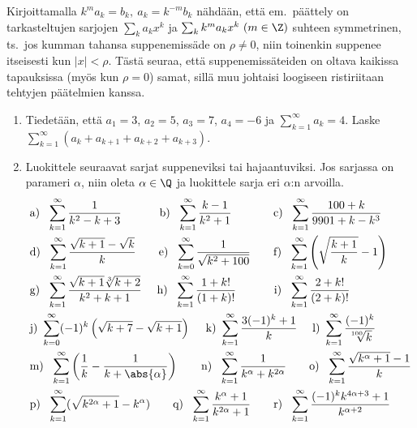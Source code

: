 Kirjoittamalla $k^ma_k=b_k,\ a_k=k^{-m}b_k$ nähdään, että em.\ päättely on tarkasteltujen
sarjojen $\sum_ka_kx^k$ ja $\sum_kk^ma_kx^k\ (m\in\Z)$ suhteen symmetrinen, ts.\ jos kumman
tahansa suppenemissäde on $\rho \neq 0$, niin toinenkin suppenee itseisesti kun $|x|<\rho$.
Tästä seuraa, että suppenemissäteiden on oltava kaikissa tapauksissa (myös kun $\rho=0$)
samat, sillä muu johtaisi loogiseen ristiriitaan tehtyjen päätelmien kanssa. \loppu  

\Harj
\begin{enumerate}

\item
Tiedetään, että $a_1=3$, $a_2=5$, $a_3=7$, $a_4=-6$ ja $\sum_{k=1}^\infty a_k=4$. Laske \newline
$\sum_{k=1}^\infty(a_k+a_{k+1}+a_{k+2}+a_{k+3})$.

\item
Luokittele seuraavat sarjat suppeneviksi tai hajaantuviksi. Jos sarjassa on parameri $\alpha$,
niin oleta $\alpha\in\Q$ ja luokittele sarja eri $\alpha$:n arvoilla.
\begin{align*}
&\text{a)}\ \ \sum_{k=1}^\infty \frac{1}{k^2-k+3} \qquad\quad\
 \text{b)}\ \ \sum_{k=1}^\infty \frac{k-1}{k^2+1} \qquad\quad\ \
 \text{c)}\ \ \sum_{k=1}^\infty \frac{100+k}{9901+k-k^3} \\
&\text{d)}\ \ \sum_{k=1}^\infty \frac{\sqrt{k+1}-\sqrt{k}}{k} \qquad 
 \text{e)}\ \ \sum_{k=0}^\infty \frac{1}{\sqrt{k^2+100}} \qquad
 \text{f)}\ \ \sum_{k=1}^\infty \left(\sqrt{\frac{k+1}{k}}-1\right) \\
&\text{g)}\ \ \sum_{k=1}^\infty \frac{\sqrt{k+1}\sqrt[3]{k+2}}{k^2+k+1} \quad\
 \text{h)}\ \ \sum_{k=1}^\infty \frac{1+k!}{(1+k)!} \qquad\quad\
 \text{i)}\ \ \sum_{k=1}^\infty \frac{2+k!}{(2+k)!} \\
&\text{j)}\ \sum_{k=0}^\infty (-1)^k\left(\sqrt{k+7}-\sqrt{k+1}\right) \quad\
 \text{k)}\ \sum_{k=1}^\infty \frac{3(-1)^k+1}{k} \quad\
 \text{l)}\ \sum_{k=1}^\infty \frac{(-1)^k}{\sqrt[100]{k}} \\
&\text{m)}\ \ \sum_{k=1}^\infty \left(\frac{1}{k}-\frac{1}{k+\abs{\alpha}}\right) \qquad
 \text{n)}\ \ \sum_{k=1}^\infty \frac{1}{k^\alpha+k^{2\alpha}} \qquad 
 \text{o)}\ \ \sum_{k=1}^\infty \frac{\sqrt{k^\alpha+1}-1}{k} \\
&\text{p)}\ \ \sum_{k=1}^\infty (\sqrt{k^{2\alpha}+1}-k^\alpha) \qquad
 \text{q)}\ \ \sum_{k=1}^\infty \frac{k^\alpha+1}{k^{2\alpha}+1} \qquad
 \text{r)}\ \ \sum_{k=1}^\infty \frac{(-1)^k k^{4\alpha+3}+1}{k^{\alpha+2}}
\end{align*}


\end{enumerate}
